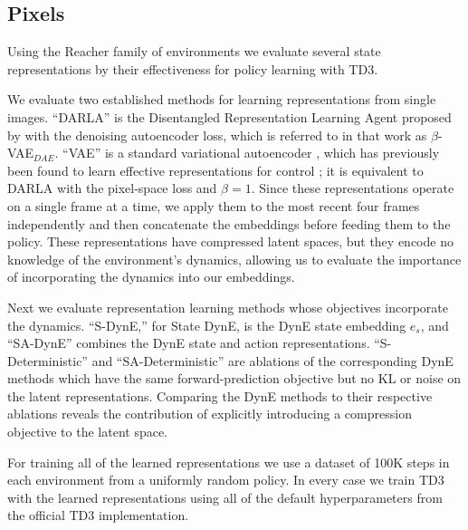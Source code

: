 \subsection{Pixels}


Using the Reacher family of environments we evaluate several state representations by their effectiveness for policy learning with TD3.

We evaluate two established methods for learning representations from single images.
``DARLA'' is the Disentangled Representation Learning Agent proposed by \citet{higgins2017darla} with the denoising autoencoder loss, which is referred to in that work as $\beta$-VAE$_{DAE}$.
``VAE'' is a standard variational autoencoder \citep{kingma2013auto,rezende2014stochastic}, which has previously been found to learn effective representations for control \citep{van2016stable}; it is equivalent to DARLA with the pixel-space loss and $\beta=1$.
Since these representations operate on a single frame at a time, we apply them to the most recent four frames independently and then concatenate the embeddings before feeding them to the policy.
These representations have compressed latent spaces, but they encode no knowledge of the environment's dynamics, allowing us to evaluate the importance of incorporating the dynamics into our embeddings.

Next we evaluate representation learning methods whose objectives incorporate the dynamics.
``S-DynE,'' for State DynE, is the DynE state embedding $e_s$, and ``SA-DynE'' combines the DynE state and action representations.
``S-Deterministic'' and ``SA-Deterministic'' are ablations of the corresponding DynE methods which have the same forward-prediction objective but no KL or noise on the latent representations.
Comparing the DynE methods to their respective ablations reveals the contribution of explicitly introducing a compression objective to the latent space.

For training all of the learned representations we use a dataset of 100K steps in each environment from a uniformly random policy.
In every case we train TD3 with the learned representations using all of the default hyperparameters from the official TD3 implementation.

